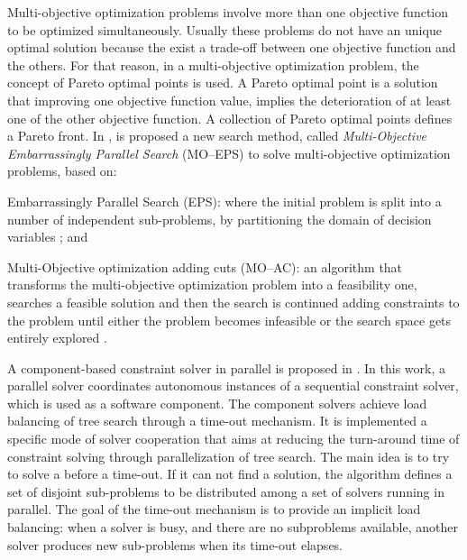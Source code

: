Multi-objective optimization problems involve more than one objective function to be optimized simultaneously. Usually these problems do not have an unique optimal solution because the exist a trade-off between one objective function and the others. For that reason, in a multi-objective optimization problem, the concept of Pareto optimal points is used. A Pareto optimal point is a solution that improving one objective function value, implies the deterioration of at least one of the other objective function. A collection of Pareto optimal points defines a Pareto front. In \cite{Yasuhara2015}, is proposed a new search method, called \textit{Multi-Objective Embarrassingly Parallel Search} (MO--EPS) to solve multi-objective optimization problems, based on: 
\begin{inparaenum}[i)]
	\item Embarrassingly Parallel Search (EPS): where the initial problem is split into a number of independent sub-problems, by partitioning the domain of decision variables \cite{Rezgui2013, Regin2014}; and
	\item Multi-Objective optimization adding cuts (MO--AC): an algorithm that transforms the multi-objective optimization problem into a feasibility one, searches a feasible solution and then the search is continued adding constraints to the problem until either the problem becomes infeasible or the search space gets entirely explored \cite{Kotecha2010}.
\end{inparaenum}

A component-based constraint solver in parallel is proposed in \cite{Zoeteweij}. In this work, a parallel solver coordinates autonomous instances of a sequential constraint solver, which is used as a software component. The component solvers achieve load balancing of tree search through a time-out mechanism. It is implemented a specific mode of solver cooperation that aims at reducing the turn-around time of constraint solving through parallelization of tree search. The main idea is to try to solve a \csp{} before a time-out. If it can not find a solution, the algorithm defines a set of disjoint sub-problems to be distributed among a set of solvers running in parallel. The goal of the time-out mechanism is to provide an implicit load balancing: when a solver is busy, and there are no subproblems available, another solver produces new sub-problems when its time-out elapses.



